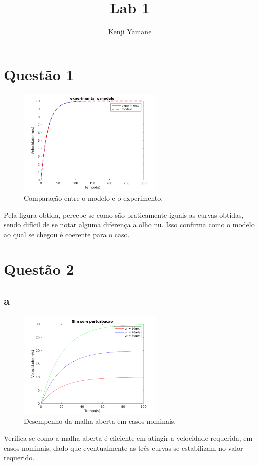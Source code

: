 \documentclass{article}[twocolumn]
\title{Lab 1}
\author{Kenji Yamane}
\begin{document}
	\maketitle
	\section{Quest\~ao 1}
	\begin{figure}[H]
		\centering
		\includegraphics[width=7cm]{teste_modelo.png}
		\caption{Compara\c{c}\~ao entre o modelo e o experimento.}
	\end{figure}
	Pela figura obtida, percebe-se como s\~ao praticamente iguais as curvas obtidas,
	sendo dif\'icil de se notar alguma diferen\c{c}a a olho nu. Isso confirma como o modelo
	ao qual se chegou \'e coerente para o caso.
	\section{Quest\~ao 2}
	\subsection{a}
	\begin{figure}[H]
		\centering
		\includegraphics[width=7cm]{2a.png}
		\caption{Desempenho da malha aberta em casos nominais.}
	\end{figure}
	Verifica-se como a malha aberta \'e eficiente em atingir a velocidade requerida, em
	casos nominais, dado que eventualmente as tr\^es curvas se estabilizam no valor requerido.
\end{document}
